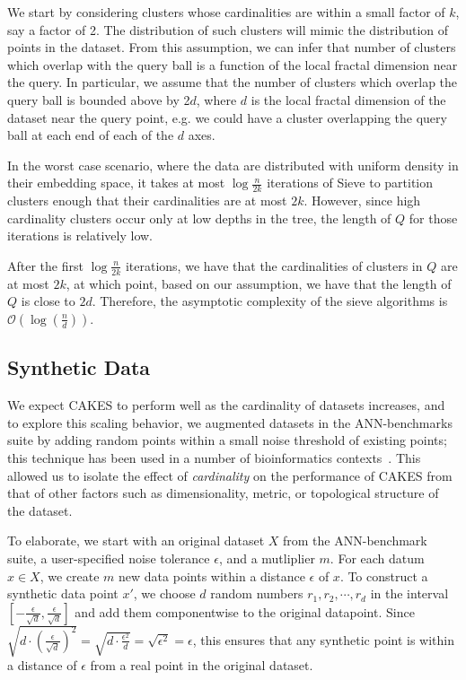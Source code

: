 We start by considering clusters whose cardinalities are within a small factor of $k$, say a factor of 2.
The distribution of such clusters will mimic the distribution of points in the dataset. 
From this assumption, we can infer that number of clusters which overlap with the query ball is a function of the local fractal dimension near the query.
In particular, we assume that the number of clusters which overlap the query ball is bounded above by 2$d$, where $d$ is the local fractal dimension of the dataset near the query point, e.g. we could have a cluster overlapping the query ball at each end of each of the $d$ axes.

In the worst case scenario, where the data are distributed with uniform density in their embedding space, it takes at most $\log{\frac{n}{2k}}$ iterations of Sieve to partition clusters enough that their cardinalities are at most $2k$.
However, since high cardinality clusters occur only at low depths in the tree, the length of $Q$ for those iterations is relatively low. 

After the first $\log{\frac{n}{2k}}$ iterations, we have that the cardinalities of clusters in $Q$ are at most $2k$, at which point, based on our assumption, we have that the length of $Q$ is close to $2d$.
Therefore, the asymptotic complexity of the sieve algorithms is $\mathcal{O}\left(\log(\frac{n}{d})\right)$.

\subsection{Synthetic Data}
\label{subsec:methods:synthetic-data}

We expect CAKES to perform well as the cardinality of datasets increases, and to explore this scaling behavior, we augmented datasets in the ANN-benchmarks suite by adding random points within a 
small noise threshold of existing points; this technique has been used in a number of bioinformatics contexts~\cite{kumar2009augmented, kumar2010recognition, daniels2012smurflite, velasco2018combining, lu2020evolution}. This allowed us to isolate the effect of \emph{cardinality} on the performance of CAKES 
from that of other factors such as dimensionality, metric, or topological structure of the dataset. 


To elaborate, we start with an original dataset $X$ from the ANN-benchmark suite, a user-specified noise tolerance $\epsilon$, and a mutliplier $m$.
For each datum $x \in X$, we create $m$ new data points within a distance $\epsilon$ of $x$. To construct a synthetic data point $x'$, we choose $d$ random numbers 
$r_1, r_2, \cdots , r_d$ in the interval $[-\tfrac{\epsilon}{\sqrt{d}}, \tfrac{\epsilon}{\sqrt{d}}]$ and add them componentwise to the original datapoint. 
Since $\sqrt{d \cdot (\tfrac{\epsilon}{\sqrt{d}})^2 } = \sqrt{d \cdot \tfrac{\epsilon^2}{d}}  = \sqrt{\epsilon^2} = \epsilon$, this ensures that any synthetic point is within a distance of $\epsilon$ from a real point in the original dataset.

